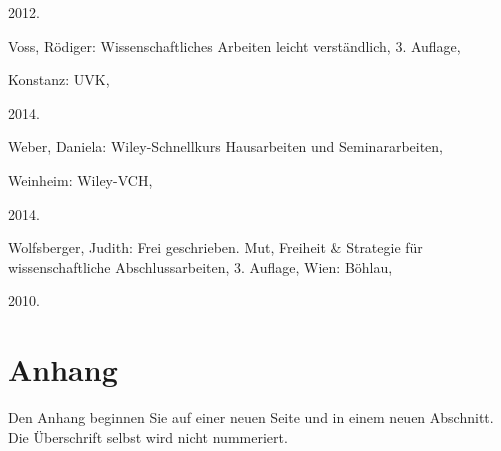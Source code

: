\documentclass[a4paper,11pt]{article}%
\renewcommand{\\}{\vspace*{0.5\baselineskip} \newline}
\begin{document}
\begin{thebibliography}{1}
	2012.

	


	Voss, Rödiger: Wissenschaftliches Arbeiten leicht verständlich, 3. Auflage,

	Konstanz: UVK,

	2014.

	


	Weber, Daniela: Wiley-Schnellkurs Hausarbeiten und Seminararbeiten,

	Weinheim: Wiley-VCH,

	2014.

	


	Wolfsberger, Judith: Frei geschrieben. Mut, Freiheit \& Strategie für wissenschaftliche Abschlussarbeiten, 3. Auflage, Wien: Böhlau,

	2010.

	

\end{thebibliography}

\newpage

\appendix



\section*{Anhang}

Den Anhang beginnen Sie auf einer neuen Seite und in einem neuen Abschnitt. Die Überschrift selbst wird nicht nummeriert.
\end{document}
